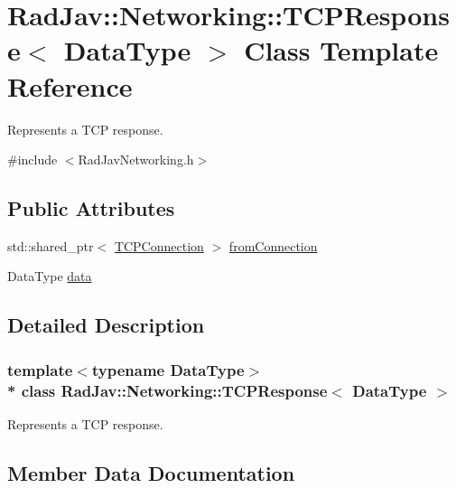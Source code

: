\hypertarget{class_rad_jav_1_1_networking_1_1_t_c_p_response}{}\section{Rad\+Jav\+:\+:Networking\+:\+:T\+C\+P\+Response$<$ Data\+Type $>$ Class Template Reference}
\label{class_rad_jav_1_1_networking_1_1_t_c_p_response}


Represents a T\+CP response.  




{\ttfamily \#include $<$Rad\+Jav\+Networking.\+h$>$}

\subsection*{Public Attributes}
\begin{DoxyCompactItemize}
\item 
std\+::shared\+\_\+ptr$<$ \hyperlink{class_rad_jav_1_1_networking_1_1_t_c_p_connection}{T\+C\+P\+Connection} $>$ \hyperlink{class_rad_jav_1_1_networking_1_1_t_c_p_response_ae219168be6d6a802e6f97f8b6b99abf4}{from\+Connection}
\item 
Data\+Type \hyperlink{class_rad_jav_1_1_networking_1_1_t_c_p_response_ac1dfaf8ec7c4a8610cff43323fe75d5c}{data}
\end{DoxyCompactItemize}


\subsection{Detailed Description}
\subsubsection*{template$<$typename Data\+Type$>$\\*
class Rad\+Jav\+::\+Networking\+::\+T\+C\+P\+Response$<$ Data\+Type $>$}

Represents a T\+CP response. 

\subsection{Member Data Documentation}
